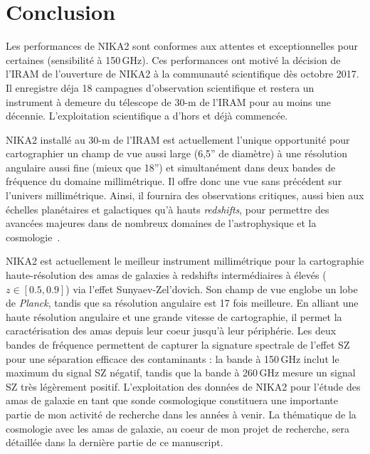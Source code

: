 \section{Conclusion}
Les performances de NIKA2 sont conformes aux attentes
et exceptionnelles pour certaines (sensibilité à 150\,GHz). Ces
performances ont motivé la décision de l'IRAM de
l'ouverture de NIKA2 à la communauté scientifique dès octobre 2017.
Il enregistre déja 18 campagnes d'observation scientifique et restera
un instrument à demeure du télescope de 30-m de l'IRAM pour
au moins une décennie. L'exploitation scientifique a d'hors et déjà
commencée.

NIKA2 installé au 30-m de l'IRAM est actuellement l'unique opportunité
pour cartographier un champ de vue aussi large (6,5'' de diamètre) à
une résolution angulaire aussi fine (mieux que 18'') et simultanément
dans deux bandes de fréquence du domaine millimétrique. Il offre donc
une vue sans précédent sur l'univers millimétrique. Ainsi, il fournira
des observations critiques, aussi bien aux échelles planétaires et
galactiques qu'à hauts \emph{redshifts}, pour permettre des avancées
majeures dans de nombreux domaines de l'astrophysique et la
cosmologie~\citep[e.g.]{Rigby2018, Bracco2017, Bethermin2017, Mancuso2016,
  Ruppin2019a}.


NIKA2 est actuellement le meilleur instrument millimétrique pour la cartographie
haute-résolution des amas de galaxies à redshifts intermédiaires à
élevés ($z\in[0.5, 0.9]$) via l'effet Sunyaev-Zel'dovich. Son champ de
vue englobe un lobe de \emph{Planck}, tandis que sa résolution
angulaire est 17 fois meilleure. En alliant une haute résolution
angulaire et une grande vitesse de cartographie, il permet la
caractérisation des amas depuis leur coeur jusqu'à leur
périphérie. Les deux bandes de fréquence permettent de capturer
la signature spectrale de l'effet SZ pour une séparation
efficace des contaminants : la bande à 150\,GHz inclut le
maximum du signal SZ négatif, tandis que la bande à 260\,GHz mesure un
signal SZ très légèrement positif. L'exploitation des données de NIKA2
pour l'étude des amas de galaxie en tant que sonde cosmologique
constituera une importante partie de mon activité de recherche dans les
années à venir. La thématique de la cosmologie avec les amas de
galaxie, au coeur de mon projet de recherche, sera détaillée dans la
dernière partie de ce manuscript.

